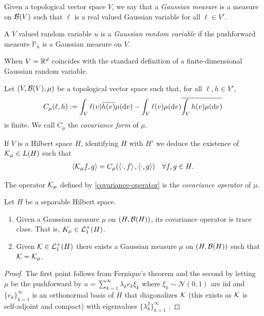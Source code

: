 \documentclass[
    a4paper,
    DIV=14,
    abstract=true,
    numbers=noenddot
]{scrartcl}
\begin{document}
\begin{definition}
    Given a topological vector space $V$, we say that a \emph{Gaussian measure } is a measure on $\Bb(V)$ such that $\ell $ is a real valued Gaussian variable for all $\ell \in V'$.
\end{definition}


\begin{definition}\label{def:gaussian random variable}
A $V$ valued random variable $u$ is a \emph{Gaussian random variable} if the pushforward measure $\mathbb{P}_u$ is a Gaussian measure on $V$.
\end{definition}
When $V=\R^d$  coincides with the standard definition of a finite-dimensional Gaussian random variable. 

\begin{definition}
Let $(V,\Bb(V),\mu )$ be a topological vector space such that, for all  $\ell ,h\in V'$,
\begin{equation*}
    C_\mu (\ell ,h):=\int_{V}\ell (v) \overline{h(v)}\mu (\rm{d} v)-\int_{V}\ell (v) \mu (\rm{d} v)\overline{\int_{V}h(v)\mu (\rm{d} v)}
\end{equation*}
is finite. We call $C_\mu $ the  \emph{covariance form} of $\mu $. 
\end{definition}
If $V$ is a Hilbert space $H$, identifying $H$ with $H'$ we deduce the existence of $\Kk _\mu \in L(H)$ such that
\begin{align}\label{covariance-operator}
       \br{\Kk _\mu f,g}= C_\mu (\br{\cdot ,f},\br{\cdot ,g})\quad\forall f,g\in H.
\end{align}
\begin{definition}
The operator $\Kk_\mu $ defined by \eqref{covariance-operator} is the \emph{covariance operator} of $\mu $.
\end{definition}
\begin{proposition}\label{covariance-kernel-gaussian} Let $H$ be a separable Hilbert space.
    \begin{enumerate}
        \item Given a Gaussian measure $\mu $ on  $(H,\Bb(H))$, its covariance operator is trace class. That is, $K_\mu \in \Ll_1^+(H)$.
        \item Given $\Kk\in \Ll_1^+(H)$ there exists a Gaussian measure $\mu $ on $(H,\Bb(H))$ such that $\Kk =\Kk _\mu $. 
    \end{enumerate}
\end{proposition}
\begin{proof} 
    The first point follows from Fernique's theorem and the second by letting $\mu $ be the pushforward by $u =\sum_{k=1}^\infty \lambda_k e_k \xi_k$ where $\xi_k\sim\mathcal{N}(0,1)$ are iid and $\{e_k\}_{k=1}^\infty$ is an orthonormal basis of $H$ that diagonalizes $\Kk$ (this exists as $\Kk $ is self-adjoint and compact) with eigenvalues $\{\lambda_k^2\}_{k=1}^\infty$  {\cite{ash2000probability}}.
\end{proof}
\end{document}
